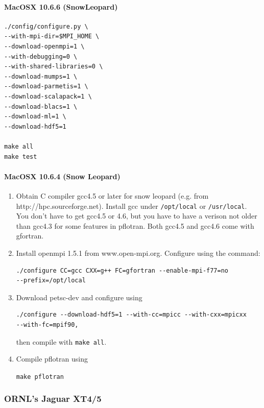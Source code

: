 \documentclass[12pt]{article}
\begin{document}
\paragraph{MacOSX 10.6.6 (SnowLeopard)}

\begin{verbatim}
./config/configure.py \
--with-mpi-dir=$MPI_HOME \
--download-openmpi=1 \
--with-debugging=0 \
--with-shared-libraries=0 \
--download-mumps=1 \
--download-parmetis=1 \
--download-scalapack=1 \
--download-blacs=1 \
--download-ml=1 \
--download-hdf5=1 

make all
make test
\end{verbatim}

\paragraph{MacOSX 10.6.4 (Snow Leopard)}

\begin{enumerate}
\item Obtain C compiler gcc4.5 or later for snow leopard (e.g. from http://hpc.sourceforge.net). 
Install gcc under \verb|/opt/local| or \verb|/usr/local|. 
You don't have to get gcc4.5 or 4.6,
but you have to have a verison not older than gcc4.3 for some features in
pflotran. Both gcc4.5 and gcc4.6 come with gfortran.

\item Install openmpi 1.5.1 from www.open-mpi.org. Configure using the command:

\begin{verbatim}
./configure CC=gcc CXX=g++ FC=gfortran --enable-mpi-f77=no 
--prefix=/opt/local
\end{verbatim}

\item Download petsc-dev and configure using

\begin{verbatim}
./configure --download-hdf5=1 --with-cc=mpicc --with-cxx=mpicxx 
--with-fc=mpif90,
\end{verbatim}

then compile with \verb|make all|.

\item Compile pflotran using

\verb|make pflotran|
\end{enumerate}

\subsubsection{ORNL's Jaguar XT4/5}
\end{document}
